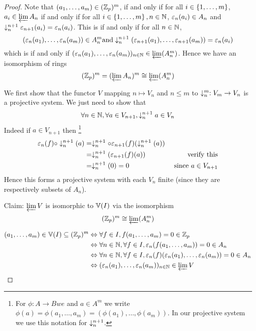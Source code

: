 \begin{proof}
    Note that $(a_1, \dots, a_m) \in (\mathbb{Z}_p)^m$, 
    if and only if for all $i \in \left\{1, \dots, m\right\}$,
    $a_i \in \varprojlim A_n$
    if and only if 
    for all $i \in \left\{1, \dots, m\right\}, n \in \mathbb{N}$,
    $\varepsilon_n(a_i) \in A_n$ and $\downarrow_{n}^{n+1}\varepsilon_{n+1}(a_i) = \varepsilon_n(a_i)$.
    This is if and only if for all $n \in \mathbb{N}$,
    \[(\varepsilon_n(a_1), \dots, \varepsilon_n(a_m)) \in A_n^m
    \text{and} \downarrow_{n}^{n+1}(\varepsilon_{n+1}(a_1), 
    \dots, \varepsilon_{n+1}(a_m)) = \varepsilon_n(a_i)\]
    which is if and only if 
    $(\varepsilon_n(a_1), \dots, \varepsilon_n(a_m))_{n \in \mathbb{N}} \in \varprojlim (A_n^m)$.
    Hence we have an isomorphism of rings 
    \[(\mathbb{Z}_p)^m = (\varprojlim{A_n})^m \cong \varprojlim (A_n^m)\]

    We first show that the functor $V$ mapping $n \mapsto V_n$ 
    and $n \le m$ to $\downarrow_{n}^{m} : V_m \to V_n$
    is a projective system.
    We just need to show that 
    \[\forall n \in \mathbb{N}, \forall a \in V_{n+1}, 
    \downarrow_{n}^{n+1} a \in V_n\]
    Indeed if $a \in V_{n+1}$ then \footnote{
        For $\phi: A \to B we $ and $a \in A^m$ we write 
        $\phi(a) = \phi(a_1, \dots, a_m) = (\phi(a_1), \dots, \phi(a_m))$.
        In our projective system we use this notation for $\downarrow_{n}^{n+1}$.
    }
    \begin{align*}
        \varepsilon_n (f) \circ \downarrow_{n}^{n+1}(a) 
        & = \downarrow_{n}^{n+1} \circ \varepsilon_{n+1} 
        (f) (\downarrow_{n}^{n+1}(a))
        & \\
        &= \downarrow_{n}^{n+1} \left(\varepsilon_{n+1} (f) (a)\right)
        & \text{ verify this}\\
        &= \downarrow_{n}^{n+1} (0) = 0 
        & \text{ since } a \in V_{n+1}
    \end{align*}
    Hence this forms a projective system with each $V_n$ 
    finite (since they are respectively subsets of $A_n$).
    
    Claim: $\varprojlim V$ is isomorphic to $\mathbb{V}(I)$
    via the isomorphism 
    \[(\mathbb{Z}_p)^m \cong \varprojlim (A_n^m)\]

    \begin{align*}
        (a_1, \dots, a_m) \in \mathbb{V}(I) \subseteq (\mathbb{Z}_p)^m 
        &\Leftrightarrow \forall f \in I, f(a_1, \dots, a_m) = 0 \in \mathbb{Z}_p\\
        &\Leftrightarrow \forall n \in \mathbb{N}, \forall f \in I,  
        \varepsilon_n(f(a_1, \dots, a_m)) = 0 \in A_n\\
        &\Leftrightarrow \forall n \in \mathbb{N}, \forall f \in I, 
        \varepsilon_n(f)(\varepsilon_n(a_1), \dots, \varepsilon_n(a_m)) = 0 \in A_n\\
        &\Leftrightarrow (\varepsilon_n(a_1), \dots, \varepsilon_n(a_m))_{n \in \mathbb{N}} \in  
        \varprojlim V
    \end{align*}
\end{proof}

